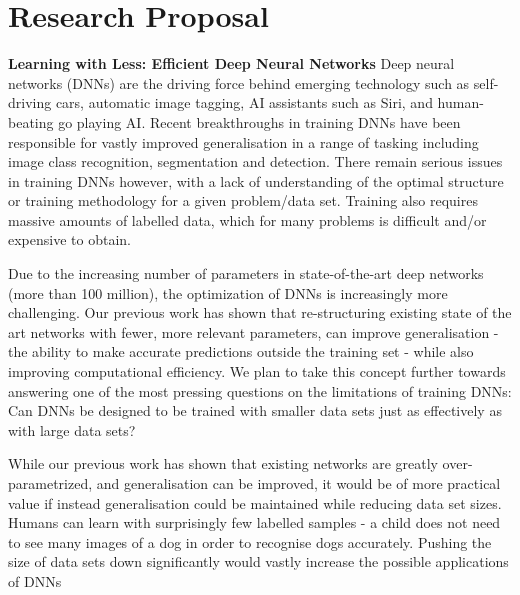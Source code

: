 \documentclass[]{article}
\begin{document}
\section{Research Proposal}
\textbf{Learning with Less: Efficient Deep Neural Networks}
Deep neural networks (DNNs) are the driving force behind emerging technology such as self-driving cars, automatic image tagging, AI assistants such as Siri, and human-beating go playing AI. Recent breakthroughs in training DNNs have been responsible for vastly improved generalisation in a range of tasking including image class recognition, segmentation and detection. There remain serious issues in training DNNs however, with a lack of understanding of the optimal structure or training methodology for a given problem/data set. Training also requires massive amounts of labelled data, which for many problems is difficult and/or expensive to obtain.

Due to the increasing number of parameters in state-of-the-art deep networks (more than 100 million), the optimization of DNNs is increasingly more challenging. Our previous work has shown that re-structuring existing state of the art networks with fewer, more relevant parameters, can improve generalisation - the ability to make accurate predictions outside the training set - while also improving computational efficiency. We plan to take this concept further towards answering one of the most pressing questions on the limitations of training DNNs: Can DNNs be designed to be trained with smaller data sets just as effectively as with large data sets?

While our previous work has shown that existing networks are greatly over-parametrized, and generalisation can be improved, it would be of more practical value if instead generalisation could be maintained while reducing data set sizes. Humans can learn with surprisingly few labelled samples - a child does not need to see many images of a dog in order to recognise dogs accurately. Pushing the size of data sets down significantly would vastly increase the possible applications of DNNs
\end{document}
